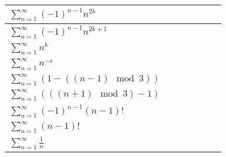 \documentclass[12pt]{article}
\newcommand{\cmark}{\ding{51}}
\newcommand{\xmark}{\ding{55}}
\begin{document}
\begin{tabular}{|l|c|c|c|c|c|c|}
$\sum_{n=1}^{\infty} (-1)^{n-1} n^{2k}$ & \textcolor{Green}{\cmark} & \textcolor{Green}{\cmark} & \textcolor{Green}{\cmark} & \textcolor{Green}{\cmark} & \textcolor{Green}{\cmark} & \textcolor{Green}{\cmark} \\ \hline

$\sum_{n=1}^{\infty} (-1)^{n-1}n^{2k+1}$ & \textcolor{Green}{\cmark} & \textcolor{Green}{\cmark} & \textcolor{Green}{\cmark} & \textcolor{Green}{\cmark} & \textcolor{Green}{\cmark} & \textcolor{Green}{\cmark} \\ \hline

$\sum_{n=1}^{\infty} n^k$ & \textcolor{Green}{\cmark} & \textcolor{Green}{\cmark} & \textcolor{Green}{\cmark} & \textcolor{Green}{\cmark} & \textcolor{Green}{\cmark} & \textcolor{Green}{\cmark} \\ \hline

$\sum_{n=1}^{\infty} n^{-s}$ & \textcolor{Green}{\cmark} & \textcolor{Green}{\cmark} & \textcolor{Green}{\cmark} & \textcolor{Green}{\cmark} & \textcolor{Green}{\cmark} & \textcolor{Green}{\cmark} \\ \hline

$\sum_{n=1}^{\infty} (1-((n-1)\mod 3))$ & \textcolor{Green}{\cmark} & \textcolor{Green}{\cmark} & \textcolor{Green}{\cmark} & \textcolor{Green}{\cmark} & \textcolor{Red}{\xmark} & \textcolor{Green}{\cmark} \\ \hline

$\sum_{n=1}^{\infty} (((n+1)\mod 3)-1)$ & \textcolor{Green}{\cmark} & \textcolor{Green}{\cmark} & \textcolor{Green}{\cmark} & \textcolor{Green}{\cmark} & \textcolor{Red}{\xmark} & \textcolor{Green}{\cmark} \\ \hline

$\sum_{n=1}^{\infty} (-1)^{n-1}(n-1)!$ & \textcolor{Red}{\xmark} & \textcolor{Green}{\cmark} & \textcolor{Red}{\xmark} & \textcolor{Red}{\xmark} & \textcolor{Red}{\xmark} & \textcolor{Green}{\cmark} \\ \hline

$\sum_{n=1}^{\infty} (n-1)!$ & \textcolor{Red}{\xmark} & \textcolor{Green}{\cmark} & \textcolor{Red}{\xmark} & \textcolor{Red}{\xmark} & \textcolor{Red}{\xmark} & \textcolor{Green}{\cmark} \\ \hline

$\sum_{n=1}^{\infty} \frac{1}{n}$ & \textcolor{Red}{\xmark} & \textcolor{Red}{\xmark} & \textcolor{Red}{\xmark} & \textcolor{Red}{\xmark} & \textcolor{Red}{\xmark} & \textcolor{Green}{\cmark} \\ \hline 

\end{tabular}
\end{document}
